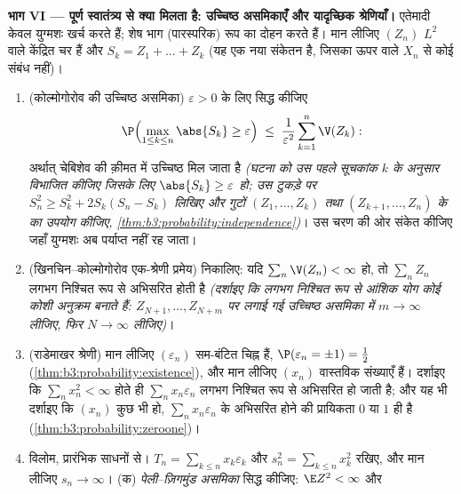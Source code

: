 \begin{problem}
\medskip
\noindent\textbf{भाग VI --- पूर्ण स्वातंत्र्य से क्या मिलता है:
उच्चिष्ठ असमिकाएँ और यादृच्छिक श्रेणियाँ।} एतेमादी केवल युग्मशः
 खर्च करते हैं; शेष भाग  (पारस्परिक) रूप का दोहन
करते हैं। मान लीजिए $(Z_n)$ $L^2$ वाले  केंद्रित चर हैं और
$S_k = Z_1 + \dots + Z_k$ (यह एक नया संकेतन है, जिसका ऊपर वाले $X_n$ से कोई संबंध
नहीं)।
\begin{enumerate}[resume]
  \item (कोल्मोगोरोव की उच्चिष्ठ असमिका) $\varepsilon
        > 0$ के लिए सिद्ध कीजिए
        \[
        \P\Bigl(\max_{1\leq k\leq n}\abs{S_k} \geq
        \varepsilon\Bigr) \;\leq\;
        \frac1{\varepsilon^2}\sum_{k=1}^n\V(Z_k) :
        \]
        अर्थात् चेबिशेव की क़ीमत में उच्चिष्ठ मिल जाता है
        \emph{(घटना को उस पहले सूचकांक $k$ के अनुसार विभाजित
        कीजिए जिसके लिए $\abs{S_k} \geq \varepsilon$ हो; उस टुकड़े पर $S_n^2 \geq S_k^2 + 2S_k(S_n - S_k)$ लिखिए और
        गुटों $(Z_1, \dots, Z_k)$ तथा $(Z_{k+1}, \dots, Z_n)$ के  का उपयोग कीजिए,
        \cref{thm:b3:probability:independence})}। उस चरण की ओर संकेत कीजिए जहाँ युग्मशः 
        अब पर्याप्त नहीं रह जाता।
  \item (खिनचिन--कोल्मोगोरोव एक-श्रेणी प्रमेय) निकालिए: यदि $\sum_n\V(Z_n) < \infty$
        हो, तो $\sum_nZ_n$ लगभग निश्चित रूप से अभिसरित होती है
        \emph{(दर्शाइए कि लगभग निश्चित रूप से आंशिक योग कोई कोशी
        अनुक्रम बनाते हैं: $Z_{N+1}, \dots, Z_{N+m}$ पर लगाई गई उच्चिष्ठ असमिका में
        $m \to
        \infty$ लीजिए, फिर $N \to
        \infty$ लीजिए)}।
  \item (राडेमाखर श्रेणी) मान लीजिए $(\varepsilon_n)$  सम-बंटित चिह्न
        हैं, $\P(\varepsilon_n = \pm1) =
        \frac12$ (\cref{thm:b3:probability:existence}), और मान लीजिए $(x_n)$ वास्तविक संख्याएँ
        हैं। दर्शाइए कि $\sum_nx_n^2 < \infty$ होते ही $\sum_nx_n\varepsilon_n$ लगभग निश्चित रूप से
        अभिसरित हो जाती है; और यह भी दर्शाइए कि $(x_n)$ कुछ भी हो,
        $\sum_nx_n\varepsilon_n$ के अभिसरित होने की प्रायिकता $0$ या $1$ ही है
        (\cref{thm:b3:probability:zeroone})।
  \item विलोम, प्रारंभिक साधनों से। $T_n = \sum_{k\leq
        n}x_k\varepsilon_k$ और $s_n^2 = \sum_{k\leq
        n}x_k^2$ रखिए, और मान
        लीजिए $s_n \to \infty$।
        (क) \emph{पेली--ज़िगमुंड असमिका} सिद्ध कीजिए: $\E Z^2 < \infty$ और

\end{enumerate}
\end{problem}
